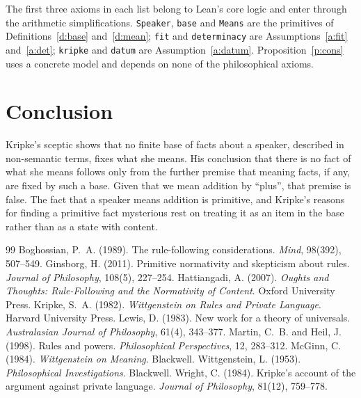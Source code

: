 \documentclass{situationist-preprint}
\begin{document}
The first three axioms in each list belong to Lean's core logic and enter through the arithmetic simplifications. \texttt{Speaker}, \texttt{base} and \texttt{Means} are the primitives of Definitions~\ref{d:base} and~\ref{d:mean}; \texttt{fit} and \texttt{determinacy} are Assumptions~\ref{a:fit} and~\ref{a:det}; \texttt{kripke} and \texttt{datum} are Assumption~\ref{a:datum}. Proposition~\ref{p:cons} uses a concrete model and depends on none of the philosophical axioms.

\section{Conclusion}

Kripke's sceptic shows that no finite base of facts about a speaker, described in non-semantic terms, fixes what she means. His conclusion that there is no fact of what she means follows only from the further premise that meaning facts, if any, are fixed by such a base. Given that we mean addition by \enquote{plus}, that premise is false. The fact that a speaker means addition is primitive, and Kripke's reasons for finding a primitive fact mysterious rest on treating it as an item in the base rather than as a state with content.

\begin{thebibliography}{99}\small
{} Boghossian, P.~A. (1989). The rule-following considerations. \emph{Mind}, 98(392), 507--549.
 Ginsborg, H. (2011). Primitive normativity and skepticism about rules. \emph{Journal of Philosophy}, 108(5), 227--254.
 Hattiangadi, A. (2007). \emph{Oughts and Thoughts: Rule-Following and the Normativity of Content}. Oxford University Press.
 Kripke, S.~A. (1982). \emph{Wittgenstein on Rules and Private Language}. Harvard University Press.
 Lewis, D. (1983). New work for a theory of universals. \emph{Australasian Journal of Philosophy}, 61(4), 343--377.
 Martin, C.~B. and Heil, J. (1998). Rules and powers. \emph{Philosophical Perspectives}, 12, 283--312.
 McGinn, C. (1984). \emph{Wittgenstein on Meaning}. Blackwell.
 Wittgenstein, L. (1953). \emph{Philosophical Investigations}. Blackwell.
 Wright, C. (1984). Kripke's account of the argument against private language. \emph{Journal of Philosophy}, 81(12), 759--778.
\end{thebibliography}
\end{document}
